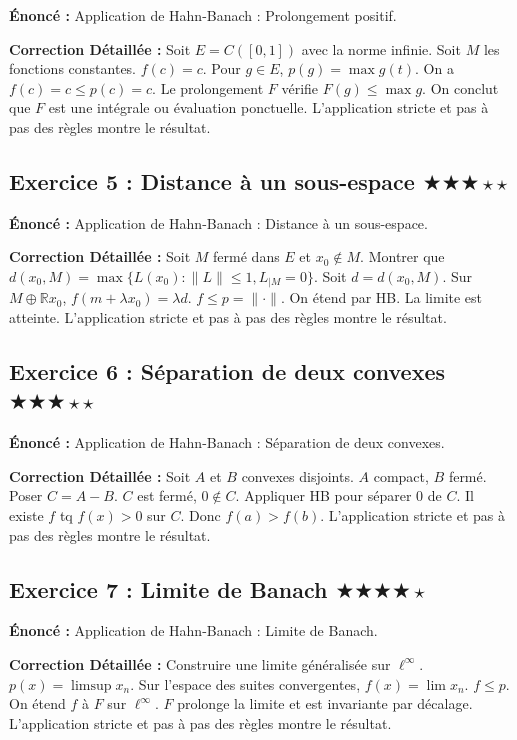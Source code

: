 \documentclass[11pt,a4paper]{article}
\begin{document}
\textbf{Énoncé :}
Application de Hahn-Banach : Prolongement positif.

\textbf{Correction Détaillée :}
Soit $E=C([0,1])$ avec la norme infinie. Soit $M$ les fonctions constantes. $f(c) = c$. Pour $g \in E$, $p(g) = \max g(t)$. On a $f(c) = c \le p(c) = c$. Le prolongement $F$ vérifie $F(g) \le \max g$. On conclut que $F$ est une intégrale ou évaluation ponctuelle.
L'application stricte et pas à pas des règles montre le résultat.


\subsection*{Exercice 5 : Distance à un sous-espace \quad $\bigstar\bigstar\bigstar\star\star$}

\textbf{Énoncé :}
Application de Hahn-Banach : Distance à un sous-espace.

\textbf{Correction Détaillée :}
Soit $M$ fermé dans $E$ et $x_0 \notin M$. Montrer que $d(x_0, M) = \max \{L(x_0) : \|L\| \le 1, L_{|M}=0\}$. Soit $d = d(x_0, M)$. Sur $M \oplus \mathbb{R}x_0$, $f(m + \lambda x_0) = \lambda d$. $f \le p = \| \cdot \|$. On étend par HB. La limite est atteinte.
L'application stricte et pas à pas des règles montre le résultat.


\subsection*{Exercice 6 : Séparation de deux convexes \quad $\bigstar\bigstar\bigstar\star\star$}

\textbf{Énoncé :}
Application de Hahn-Banach : Séparation de deux convexes.

\textbf{Correction Détaillée :}
Soit $A$ et $B$ convexes disjoints. $A$ compact, $B$ fermé. Poser $C = A-B$. $C$ est fermé, $0 \notin C$. Appliquer HB pour séparer $0$ de $C$. Il existe $f$ tq $f(x) > 0$ sur $C$. Donc $f(a) > f(b)$.
L'application stricte et pas à pas des règles montre le résultat.


\subsection*{Exercice 7 : Limite de Banach \quad $\bigstar\bigstar\bigstar\bigstar\star$}

\textbf{Énoncé :}
Application de Hahn-Banach : Limite de Banach.

\textbf{Correction Détaillée :}
Construire une limite généralisée sur $\ell^\infty$. $p(x) = \limsup x_n$. Sur l'espace des suites convergentes, $f(x) = \lim x_n$. $f \le p$. On étend $f$ à $F$ sur $\ell^\infty$. $F$ prolonge la limite et est invariante par décalage.
L'application stricte et pas à pas des règles montre le résultat.
\end{document}

